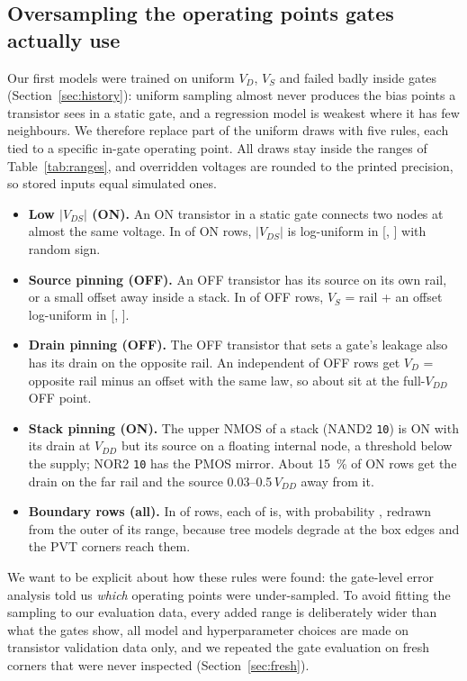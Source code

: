 \subsection{Oversampling the operating points gates actually use}\label{sec:oversampling}
Our first models were trained on uniform $V_D$, $V_S$ and failed badly inside gates
(Section~\ref{sec:history}): uniform sampling almost never produces the bias points a transistor
sees in a static gate, and a regression model is weakest where it has few neighbours. We
therefore replace part of the uniform draws with five rules, each tied to a specific in-gate
operating point. All draws stay inside the ranges of Table~\ref{tab:ranges}, and overridden
voltages are rounded to the printed precision, so stored inputs equal simulated ones.
\begin{itemize}
  \item \textbf{Low $|V_{DS}|$ (ON).} An ON transistor in a static gate connects two nodes at
        almost the same voltage. In \LowVdsFrac{} of ON rows, $|V_{DS}|$ is log-uniform in
        [\LowVdsMin, \LowVdsMax] with random sign.
  \item \textbf{Source pinning (OFF).} An OFF transistor has its source on its own rail, or a
        small offset away inside a stack. In \SourcePinFrac{} of OFF rows, $V_S$ = rail + an offset
        log-uniform in [\PinMin, \PinMax].
  \item \textbf{Drain pinning (OFF).} The OFF transistor that sets a gate's leakage also has its
        drain on the opposite rail. An independent \DrainPinFrac{} of OFF rows get $V_D$ = opposite
        rail minus an offset with the same law, so about \BothPinFrac{} sit at the full-$V_{DD}$
        OFF point.
  \item \textbf{Stack pinning (ON).} The upper NMOS of a stack (NAND2 \texttt{10}) is ON with its
        drain at $V_{DD}$ but its source on a floating internal node, a threshold below the
        supply; NOR2 \texttt{10} has the PMOS mirror. About \qty{15}{\percent} of ON rows get the
        drain on the far rail and the source \numrange{0.03}{0.5}\,$V_{DD}$ away from it.
  \item \textbf{Boundary rows (all).} In \BoundaryFrac{} of rows, each of \BoundaryInputs{} is,
        with probability \BoundaryPerInput, redrawn from the outer \BoundaryBand{} of its range,
        because tree models degrade at the box edges and the PVT corners reach them.
\end{itemize}

We want to be explicit about how these rules were found: the gate-level error analysis told us
\emph{which} operating points were under-sampled. To avoid fitting the sampling to our evaluation
data, every added range is deliberately wider than what the gates show, all model and
hyperparameter choices are made on transistor validation data only, and we repeated the gate
evaluation on fresh corners that were never inspected (Section~\ref{sec:fresh}).

